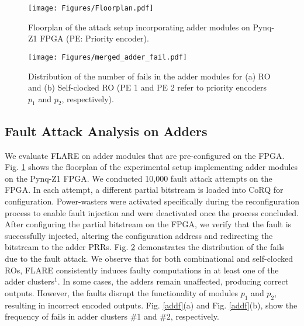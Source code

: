 \vspace{-0.1cm}
 \begin{figure}
\centering
\texttt{[image: Figures/Floorplan.pdf]}

\caption{Floorplan of the attack setup incorporating adder modules on Pynq-Z1 FPGA (PE: Priority encoder).}
\label{addfloorplan}
\vspace{-0.6cm}
\end{figure}
 \begin{figure}[t]

\texttt{[image: Figures/merged\_adder\_fail.pdf]}

\caption{Distribution of the number of fails in the adder modules for (a) RO and (b) Self-clocked RO (PE 1 and PE 2 refer to priority encoders $p_1$ and $p_2$, respectively).}
\label{adder}
\vspace{-0.5cm}
\end{figure}




\subsection{Fault Attack Analysis on Adders}
\vspace{-0.1cm}
We evaluate FLARE on adder modules that are pre-configured on the FPGA. Fig. \ref{addfloorplan} shows the floorplan of the experimental setup implementing adder modules on the Pynq-Z1 FPGA. We conducted 10,000 fault attack attempts on the FPGA. In each attempt, a different partial bitstream is loaded into CoRQ for configuration. Power-wasters were activated specifically during the reconfiguration process to enable fault injection and were deactivated once the process concluded. After configuring the partial bitstream on the FPGA, we verify that the fault is successfully injected, altering the configuration address and redirecting the bitstream to the adder PRRs. Fig. \ref{adder} demonstrates the distribution of the fails due to the fault attack. We observe that for both combinational and self-clocked ROs, FLARE consistently induces faulty computations in at least one of the adder clusters$^1$. In some cases, the adders  remain unaffected, producing correct outputs. However, the faults disrupt the functionality of modules $p_1$ and $p_2$, resulting in incorrect encoded outputs. Fig. \ref{addf}(a) and Fig. \ref{addf}(b), show the frequency of fails in adder clusters \#1 and \#2, respectively. 



